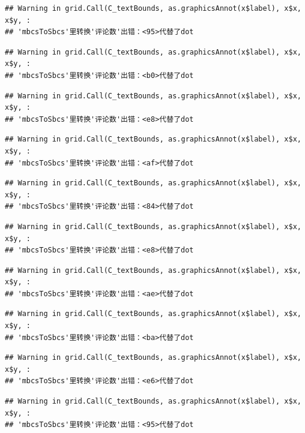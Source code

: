 \documentclass[
]{article}
\begin{document}
\begin{verbatim}
## Warning in grid.Call(C_textBounds, as.graphicsAnnot(x$label), x$x, x$y, :
## 'mbcsToSbcs'里转换'评论数'出错：<95>代替了dot
\end{verbatim}

\begin{verbatim}
## Warning in grid.Call(C_textBounds, as.graphicsAnnot(x$label), x$x, x$y, :
## 'mbcsToSbcs'里转换'评论数'出错：<b0>代替了dot
\end{verbatim}

\begin{verbatim}
## Warning in grid.Call(C_textBounds, as.graphicsAnnot(x$label), x$x, x$y, :
## 'mbcsToSbcs'里转换'评论数'出错：<e8>代替了dot
\end{verbatim}

\begin{verbatim}
## Warning in grid.Call(C_textBounds, as.graphicsAnnot(x$label), x$x, x$y, :
## 'mbcsToSbcs'里转换'评论数'出错：<af>代替了dot
\end{verbatim}

\begin{verbatim}
## Warning in grid.Call(C_textBounds, as.graphicsAnnot(x$label), x$x, x$y, :
## 'mbcsToSbcs'里转换'评论数'出错：<84>代替了dot
\end{verbatim}

\begin{verbatim}
## Warning in grid.Call(C_textBounds, as.graphicsAnnot(x$label), x$x, x$y, :
## 'mbcsToSbcs'里转换'评论数'出错：<e8>代替了dot
\end{verbatim}

\begin{verbatim}
## Warning in grid.Call(C_textBounds, as.graphicsAnnot(x$label), x$x, x$y, :
## 'mbcsToSbcs'里转换'评论数'出错：<ae>代替了dot
\end{verbatim}

\begin{verbatim}
## Warning in grid.Call(C_textBounds, as.graphicsAnnot(x$label), x$x, x$y, :
## 'mbcsToSbcs'里转换'评论数'出错：<ba>代替了dot
\end{verbatim}

\begin{verbatim}
## Warning in grid.Call(C_textBounds, as.graphicsAnnot(x$label), x$x, x$y, :
## 'mbcsToSbcs'里转换'评论数'出错：<e6>代替了dot
\end{verbatim}

\begin{verbatim}
## Warning in grid.Call(C_textBounds, as.graphicsAnnot(x$label), x$x, x$y, :
## 'mbcsToSbcs'里转换'评论数'出错：<95>代替了dot
\end{verbatim}
\end{document}

